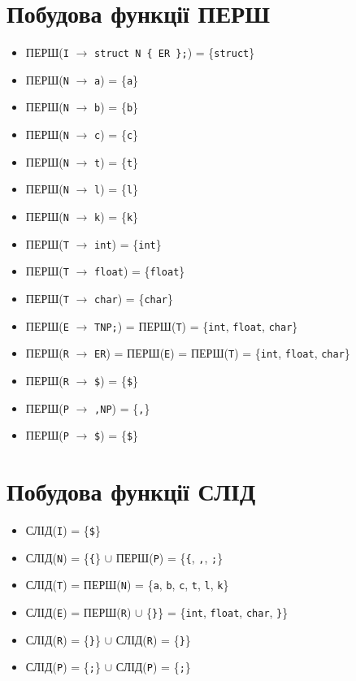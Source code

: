 \newpage
\section{Побудова функції ПЕРШ}
\begin{itemize}
    \item[]  ПЕРШ(\verb|I| $\to$ \verb|struct N { ER };|) = \{\verb|struct|\}
    \item[]  ПЕРШ(\verb|N| $\to$ \verb|a|)                = \{\verb|a|\}
    \item[]  ПЕРШ(\verb|N| $\to$ \verb|b|)                = \{\verb|b|\}
    \item[]  ПЕРШ(\verb|N| $\to$ \verb|c|)                = \{\verb|c|\}
    \item[]  ПЕРШ(\verb|N| $\to$ \verb|t|)                = \{\verb|t|\}
    \item[]  ПЕРШ(\verb|N| $\to$ \verb|l|)                = \{\verb|l|\}
    \item[]  ПЕРШ(\verb|N| $\to$ \verb|k|)                = \{\verb|k|\}
    \item[]  ПЕРШ(\verb|T| $\to$ \verb|int|)              = \{\verb|int|\}
    \item[]  ПЕРШ(\verb|T| $\to$ \verb|float|)            = \{\verb|float|\}
    \item[]  ПЕРШ(\verb|T| $\to$ \verb|char|)             = \{\verb|char|\}
    \item[]  ПЕРШ(\verb|E| $\to$ \verb|TNP;|)             = ПЕРШ(\verb|T|) = \{\verb|int|, \verb|float|, \verb|char|\}
    \item[]  ПЕРШ(\verb|R| $\to$ \verb|ER|)               = ПЕРШ(\verb|E|) = ПЕРШ(\verb|T|) = \{\verb|int|, \verb|float|, \verb|char|\}
    \item[]  ПЕРШ(\verb|R| $\to$ \verb|$|)                = \{\verb|$|\}
    \item[]  ПЕРШ(\verb|P| $\to$ \verb|,NP|)              = \{\verb|,|\}
    \item[]  ПЕРШ(\verb|P| $\to$ \verb|$|)                = \{\verb|$|\}
\end{itemize}

\section{Побудова функції СЛІД}
\begin{itemize}
    \item[]  СЛІД(\verb|I|) = \{\verb|$|\}
    \item[]  СЛІД(\verb|N|) = \{\verb|{|\} $\cup$ ПЕРШ(\verb|P|) = \{\verb|{|, \verb|,|, \verb|;|\}
    \item[]  СЛІД(\verb|T|) = ПЕРШ(\verb|N|) = \{\verb|a|, \verb|b|, \verb|c|, \verb|t|, \verb|l|, \verb|k|\}
    \item[]  СЛІД(\verb|E|) = ПЕРШ(\verb|R|) $\cup$ \{\verb|}|\} = \{\verb|int|, \verb|float|, \verb|char|, \verb|}|\}
    \item[]  СЛІД(\verb|R|) = \{\verb|}|\} $\cup$ СЛІД(\verb|R|) = \{\verb|}|\}
    \item[]  СЛІД(\verb|P|) = \{\verb|;|\} $\cup$ СЛІД(\verb|P|) = \{\verb|;|\}
\end{itemize}

